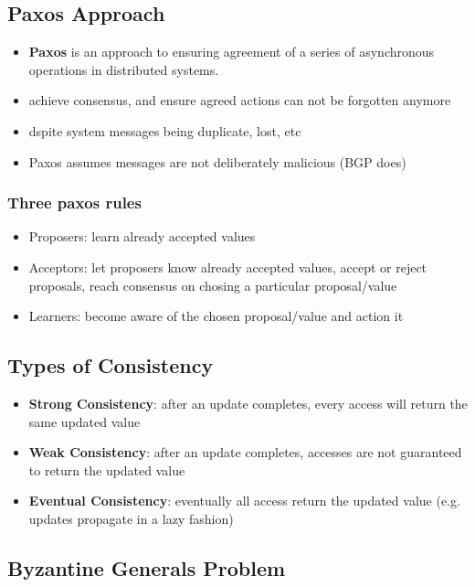 \documentclass[a4paper]{article}
\begin{document}
\begin{multicols}{3}
\subsection{Paxos Approach}
\begin{itemize}
    \item \textbf{Paxos} is an approach to ensuring agreement of a series of asynchronous operations in distributed systems.
    \item achieve consensus, and ensure agreed actions can not be forgotten anymore
    \item dspite system messages being duplicate, lost, etc
    \item Paxos assumes messages are not deliberately malicious (BGP does)
\end{itemize}

\subsubsection{Three paxos rules}
\begin{itemize}
    \item Proposers: learn already accepted values
    \item Acceptors: let proposers know already accepted values, accept or reject proposals, reach consensus on chosing a particular proposal/value
    \item Learners: become aware of the chosen proposal/value and action it
\end{itemize}

\subsection{Types of Consistency}
\begin{itemize}
    \item \textbf{Strong Consistency}: after an update completes, every access will return the same updated value
    \item \textbf{Weak Consistency}: after an update completes, accesses are not guaranteed to return the updated value
    \item \textbf{Eventual Consistency}: eventually all access return the updated value (e.g. updates propagate in a lazy fashion)
\end{itemize}

\subsection{Byzantine Generals Problem}

\end{multicols}
\end{document}
